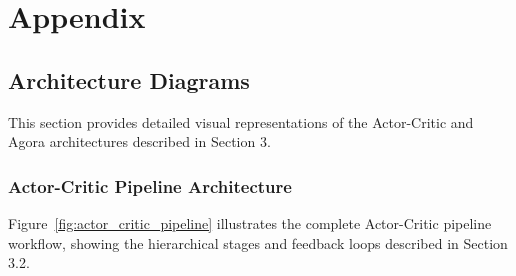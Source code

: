 \section{Appendix}

\subsection{Architecture Diagrams}
\label{appendix:architectures}

This section provides detailed visual representations of the Actor-Critic and Agora architectures described in Section 3.

\subsubsection{Actor-Critic Pipeline Architecture}

Figure~\ref{fig:actor_critic_pipeline} illustrates the complete Actor-Critic pipeline workflow, showing the hierarchical stages and feedback loops described in Section 3.2.

